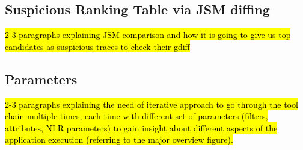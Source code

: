 \subsection{Suspicious Ranking Table via JSM diffing}

\hl{2-3 paragraphs explaining JSM comparison and how it is going to give us top candidates as suspicious traces to check their gdiff}
\subsection{Parameters}

\hl{2-3 paragraphs explaining the need of iterative approach to go through the tool chain multiple times, each time with different set of parameters (filters, attributes, NLR parameters) to gain insight about different aspects of the application execution (referring to the major overview figure).}